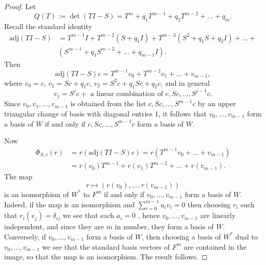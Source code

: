 \documentclass[10pt,a4paper]{amsart}
\newcommand{\adj}{\textrm{adj}}
\newcommand{\trm}[1]{\textrm{#1}}
\begin{document}
\begin{proof}
Let 
$$
Q(T) := \det(T I -S) = T^m +q_1 T^{m-1} + q_2 T^{m-2} + \ldots + q_m.
$$
Recall the standard identity 
\begin{align*}
\trm{adj}(TI-S) &= T^{m-1}I + T^{m-2}(S + q_1 I) + T^{m-3}(S^2 + q_1 S + q_2I) + \ldots + \\
& (S^{m-1} + q_1 S^{m-2} + \ldots + q_{m-1}I).
\end{align*}
Then 
$$
\trm{adj}(TI-S)c = T^{m-1}v_0 + T^{m-2}v_1 + \ldots + v_{m-1},
$$
where $v_0 = c$, $v_1 = Sc + q_1 c$, $v_2 = S^2 c + q_1 Sc + q_2 c$, and in general 
$$
v_j = S^j c + \trm{ a  linear combination of } c, Sc, \ldots, S^{j-1}c.
$$
Since $v_0, v_1,\ldots, v_{m-1}$ is obtained from the list $c, Sc, \ldots, S^{m-1}c$ by an upper triangular change of basis with diagonal entries $1$, it follows that $v_0, \ldots, v_{m-1}$ form a basis of $W$ if and only if $c, Sc, \ldots, S^{m-1}c$ form a basis of $W$.

Now 
\begin{align*}
\Phi_{S,c}(r) &= r ( \adj(TI-S)c ) = r \left( T^{m-1}v_0 + \ldots + v_{m-1} \right) \\
&= r(v_0) T^{m-1} + r(v_1) T^{m-2} + \ldots + r(v_{m-1}).
\end{align*}
The map 
$$
r \mapsto (r(v_0), \ldots, r(v_{m-1}))
$$
is an isomorphism of $W^*$ to $F^m$ if and only if $v_0, \ldots, v_{m-1}$ form a basis of $W$. Indeed, if the map is an isomorphism and $\sum_{i = 0}^{m-1} a_i v_i = 0$ then choosing $r_i$ such that $r_i(v_j) = \delta_{ij}$ we see that each $a_i = 0$ , hence $v_0, \ldots, v_{m-1}$ are linearly independent, and since they are $m$ in number, they form a basis of $W$. Conversely, if $v_0, \ldots, v_{m-1}$ form a basis of $W$, then choosing a basis of $W^*$ dual to $v_0, \ldots, v_{m-1}$ we see that the standard basis vectors of $F^m$ are contained in the image, so that the map is an isomorphism. The result follows.
\end{proof}
\end{document}
